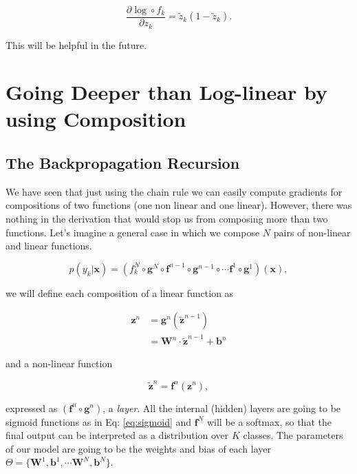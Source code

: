 \begin{equation}
\frac{\partial \log \circ f_{k}}{\partial z_{k}} = \tilde{z}_{k} (1-\tilde{z}_{k}).
\label{eq:partsigmoid}
\end{equation}

\noindent This will be helpful in the future.

\section{Going Deeper than Log-linear by using Composition}

\subsection{The Backpropagation Recursion}

We have seen that just using the chain rule we can easily compute gradients for
compositions of two functions (one non linear and one linear). However, there
was nothing in the derivation that would stop us from composing more than two
functions. Let's imagine a general case in which we compose $N$ pairs of
non-linear and linear functions.

\begin{equation}
p(y_k|\mathbf{x}) = (f_k^N \circ \mathbf{g}^N \circ \mathbf{f}^{n-1} \circ \mathbf{g}^{n-1} \circ \cdots \mathbf{f}^1 \circ \mathbf{g}^1)(\mathbf{x}),
\end{equation}

\noindent we will define each composition of a linear function as

\begin{align}
\mathbf{z}^n & = \mathbf{g}^n(\tilde{\mathbf{z}}^{n-1})\nonumber\\ &= \mathbf{W}^n \cdot \tilde{\mathbf{z}}^{n-1} + \mathbf{b}^n 
\end{align}

\noindent and a non-linear function 

\begin{equation}
\tilde{\mathbf{z}}^n = \mathbf{f}^n(\mathbf{z}^n),
\end{equation}

expressed as $(\mathbf{f}^n \circ \mathbf{g}^n)$, a \textit{layer}. All the
internal (hidden) layers are going to be sigmoid functions as in Eq:
\ref{eq:sigmoid} and $\mathbf{f}^N$ will be a softmax, so that the final output
can be interpreted as a distribution over $K$ classes. The parameters of our
model are going to be the weights and bias of each layer
$\Theta=\{\mathbf{W}^1, \mathbf{b}^1, \cdots \mathbf{W}^N, \mathbf{b}^N\}$.  

